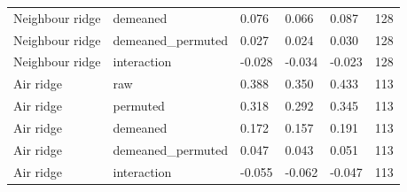 {\begin{longtable}{p{}p{}p{}p{}p{}p{}}
Neighbour ridge & demeaned & 0.076 & 0.066 & 0.087 & 128 \\
Neighbour ridge & demeaned\_\allowbreak permuted & 0.027 & 0.024 & 0.030 & 128 \\
Neighbour ridge & interaction & -0.028 & -0.034 & -0.023 & 128 \\
Air ridge & raw & 0.388 & 0.350 & 0.433 & 113 \\
Air ridge & permuted & 0.318 & 0.292 & 0.345 & 113 \\
Air ridge & demeaned & 0.172 & 0.157 & 0.191 & 113 \\
Air ridge & demeaned\_\allowbreak permuted & 0.047 & 0.043 & 0.051 & 113 \\
Air ridge & interaction & -0.055 & -0.062 & -0.047 & 113 \\
\bottomrule
\end{longtable}
}

